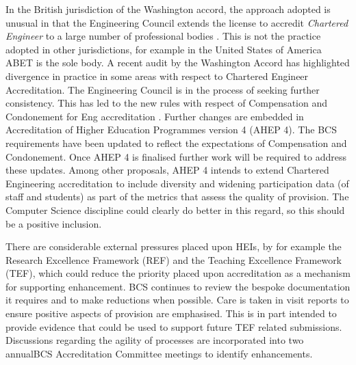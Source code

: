 \documentclass[sigconf]{acmart}
\begin{document}
In the British jurisdiction of the Washington accord, the approach adopted is unusual in that the Engineering Council extends the license to accredit \emph{Chartered Engineer} to a large number of professional bodies \cite{EC2019}. This is not the practice adopted in other jurisdictions, for example in the United States of America ABET is the sole body. A recent audit by the Washington Accord has highlighted divergence in practice in some areas with respect to Chartered Engineer Accreditation. The Engineering Council is in the process of seeking further consistency. This has led to the new rules with respect of Compensation and Condonement for Eng accreditation \cite{EC2018}. Further changes are embedded in Accreditation of Higher Education Programmes version 4 (AHEP 4). The BCS requirements have been updated to reflect the expectations of Compensation and Condonement. Once AHEP 4 is finalised further work will be required to address these updates. Among other proposals, AHEP 4 intends to extend Chartered Engineering accreditation to include diversity and widening participation data (of staff and students) as part of the metrics that assess the quality of provision. The Computer Science discipline could clearly do better in this regard, so this should be a positive inclusion.

There are considerable external pressures placed upon HEIs, by for example the Research Excellence Framework (REF) and the Teaching Excellence Framework (TEF), which could reduce the priority placed upon accreditation as a mechanism for supporting enhancement. BCS continues to review the bespoke documentation it requires and to make reductions when possible. Care is taken in visit reports to ensure positive aspects of provision are emphasised. This is in part intended to provide evidence that could be used to support future TEF related submissions. Discussions regarding the agility of processes are incorporated into two annualBCS Accreditation Committee meetings to identify enhancements. 
\end{document}
